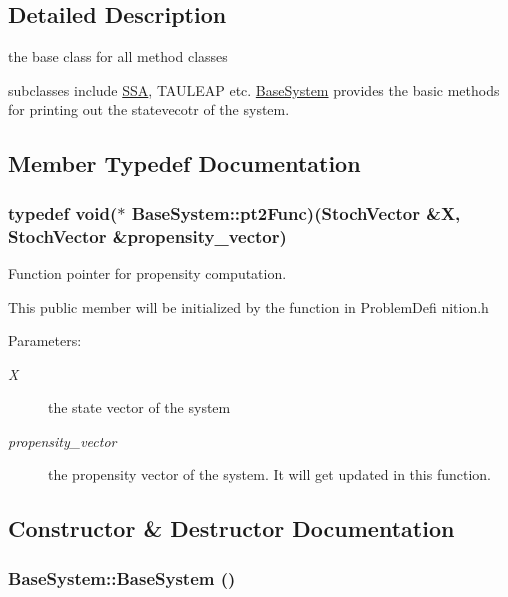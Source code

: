 \subsection{Detailed Description}
the base class for all method classes 

subclasses include \hyperlink{class_s_s_a}{SSA}, TAULEAP etc. \hyperlink{class_base_system}{BaseSystem} provides the basic methods for printing out the statevecotr of the system. 

\subsection{Member Typedef Documentation}
\hypertarget{class_base_system_9ce58c7ac60c7208b32233435ee5fd72}{
\subsubsection{\setlength{\rightskip}{0pt plus 5cm}typedef void($\ast$ {\bf BaseSystem::pt2Func})({\bf StochVector} \&{\bf X}, {\bf StochVector} \&{\bf propensity\_\-vector})}}
\label{class_base_system_9ce58c7ac60c7208b32233435ee5fd72}


Function pointer for propensity computation. 

This public member will be initialized by the function in ProblemDefi nition.h \begin{Desc}
\item[Parameters:]
\begin{description}
\item[{\em X}]the state vector of the system \item[{\em propensity\_\-vector}]the propensity vector of the system. It will get updated in this function. \end{description}
\end{Desc}


\subsection{Constructor \& Destructor Documentation}
\hypertarget{class_base_system_77a342bf74a7e875f35ff1c70dd8c310}{
\subsubsection{\setlength{\rightskip}{0pt plus 5cm}BaseSystem::BaseSystem ()}}
\label{class_base_system_77a342bf74a7e875f35ff1c70dd8c310}


